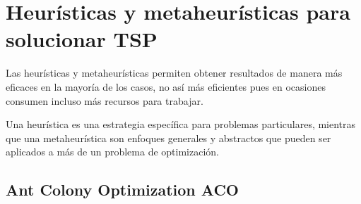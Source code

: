 \titleformat{\chapter}[display]
    {\normalfont\Large\bfseries}{\filleft\chaptertitlename\ \thechapter}{20pt}{\Huge}
    \chapter{Heurísticas y metaheurísticas para solucionar TSP}
        Las heurísticas y metaheurísticas permiten obtener resultados de manera más eficaces en la mayoría de los casos, no así más eficientes pues en ocasiones consumen incluso más recursos para trabajar. 
        
        Una heurística es una estrategia específica para problemas particulares, mientras que una metaheurística son enfoques generales y abstractos que pueden ser aplicados a más de un problema de optimización. 
        
            \section{Ant Colony Optimization ACO}
                
